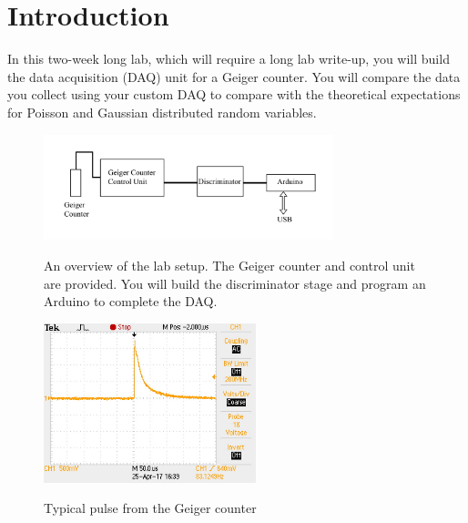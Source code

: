 \documentclass[12pt]{article}
\begin{document}

\section{Introduction}

In this two-week long lab, which will require a long lab write-up, you
will build the data acquisition (DAQ) unit for a Geiger counter.  You
will compare the data you collect using your custom DAQ to compare
with the theoretical expectations for Poisson and Gaussian distributed
random variables.

\begin{figure}[htbp]
\begin{center}
{\includegraphics[width=0.75\textwidth]{figs/plan.pdf}}
\end{center}
\caption{\label{fig:plan} An overview of the lab setup.  The Geiger
  counter and control unit are provided.  You will build the
  discriminator stage and program an Arduino to complete the DAQ.}
\end{figure}

\begin{figure}[htbp]
\begin{center}
{\includegraphics[width=0.55\textwidth]{figs/geiger_pulse.jpg}}
\end{center}
\caption{\label{fig:geigerpulse} Typical pulse from the Geiger counter}
\end{figure}
\end{document}
